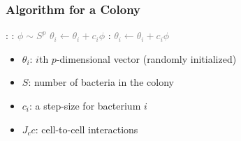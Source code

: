 \documentclass{beamer}
\begin{document}
\begin{frame}
\frametitle{Algorithm for a Colony}
\begin{algorithmic}[1]
\For {\textcolor{gray}{$j \gets 1 \dots N_c $}}:
  :
    \State \textcolor{gray}{$\phi \sim S^p$}
    \State \textcolor{gray}{$\theta_i \gets \theta_i + c_i \phi$}
    :
      \State \textcolor{gray}{$\theta_i \gets \theta_i + c_i \phi$}
    \EndWhile
  \EndFor
\EndFor
\end{algorithmic}
\begin{itemize}
  \item $\theta_i$: $i$th $p$-dimensional vector (randomly initialized)
  \item $S$: number of bacteria in the colony
  \item $c_i$: a step-size for bacterium $i$
  \item $J_cc$: cell-to-cell interactions
\end{itemize}
\end{frame}
\end{document}
